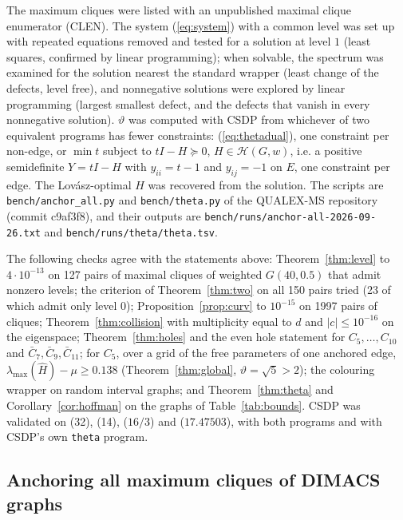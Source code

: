 \documentclass[11pt]{article}
\theoremstyle{definition}
\theoremstyle{remark}
\newcommand{\Hc}{\mathcal{H}}
\newcommand{\hH}{\hat{H}}
\newcommand{\lmax}{\lambda_{\max}}
\newcommand{\gr}[1]{\texttt{\detokenize{#1}}}
\begin{document}
The maximum cliques were listed with an unpublished maximal clique
enumerator (CLEN). The system (\ref{eq:system}) with a common level was set
up with repeated equations removed and tested for a solution at level $1$
(least squares, confirmed by linear programming); when solvable, the
spectrum was examined for the solution nearest the standard wrapper (least
change of the defects, level free), and nonnegative solutions were explored
by linear programming (largest smallest defect, and the defects that vanish
in every nonnegative solution). $\vartheta$ was computed with CSDP
\cite{Bo99} from whichever of two equivalent programs has fewer
constraints: (\ref{eq:thetadual}), one constraint per non-edge, or
$\min t$ subject to $tI-H\succeq0$, $H\in\Hc(G,w)$, i.e. a positive
semidefinite $Y=tI-H$ with $y_{ii}=t-1$ and $y_{ij}=-1$ on $E$, one
constraint per edge. The Lov\'asz-optimal $H$ was recovered from the solution.
The scripts are \texttt{bench/anchor\_all.py} and \texttt{bench/theta.py} of
the QUALEX-MS repository (commit c9af3f8), and their outputs are
\texttt{bench/runs/anchor-all-2026-09-26.txt} and
\texttt{bench/runs/theta/theta.tsv}.

The following checks agree with the statements above:
Theorem~\ref{thm:level} to $4\cdot10^{-13}$ on 127 pairs of maximal cliques
of weighted $G(40,0.5)$ that admit nonzero levels; the criterion of
Theorem~\ref{thm:two} on all 150 pairs tried (23 of which admit only level
$0$); Proposition~\ref{prop:curv} to $10^{-15}$ on 1997 pairs of cliques;
Theorem~\ref{thm:collision} with multiplicity equal to $d$ and $|c|\leq
10^{-16}$ on the eigenspace; Theorem~\ref{thm:holes} and the even hole
statement for $C_5,\ldots,C_{10}$ and $\bar C_7,\bar C_9,\bar C_{11}$; for
$C_5$, over a grid of the free parameters of one anchored edge,
$\lmax(\hH)-\mu\geq0.138$ (Theorem~\ref{thm:global}, $\vartheta=\sqrt5>2$);
the colouring wrapper on random interval graphs; and
Theorem~\ref{thm:theta} and Corollary~\ref{cor:hoffman} on the graphs of
Table~\ref{tab:bounds}. CSDP was validated on \gr{hamming6-2} (32),
\gr{johnson8-4-4} (14), \gr{hamming6-4} ($16/3$) and \gr{MANN_a9}
($17.47503$), with both programs and with CSDP's own \texttt{theta} program.

\subsection{Anchoring all maximum cliques of DIMACS graphs}
\end{document}
